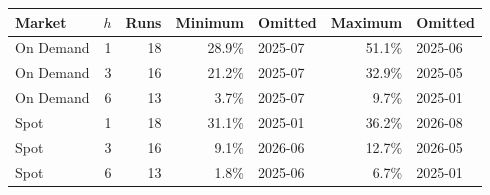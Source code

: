 \begin{tabular}{lrrrlrl}
\toprule
Market & $h$ & Runs & Minimum & Omitted & Maximum & Omitted \\
\midrule
On Demand & 1 & 18 & 28.9\% & 2025-07 & 51.1\% & 2025-06 \\
On Demand & 3 & 16 & 21.2\% & 2025-07 & 32.9\% & 2025-05 \\
On Demand & 6 & 13 & 3.7\% & 2025-07 & 9.7\% & 2025-01 \\
Spot & 1 & 18 & 31.1\% & 2025-01 & 36.2\% & 2026-08 \\
Spot & 3 & 16 & 9.1\% & 2026-06 & 12.7\% & 2026-05 \\
Spot & 6 & 13 & 1.8\% & 2025-06 & 6.7\% & 2025-01 \\
\bottomrule
\end{tabular}
